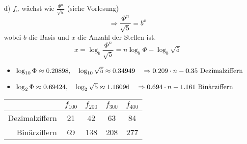 \begin{paragraph}{d)}
$f_n$ wächst wie $\frac{\Phi^n}{\sqrt{5}}$ (siehe Vorlesung)
\[ \Rightarrow \frac{\Phi^n}{\sqrt{5}} = b^x \] wobei $b$ die Basis und $x$ die Anzahl der Stellen ist.
\[ x = \log_b \frac{\Phi^n}{\sqrt{5}} = n \log_b \Phi - \log_b \sqrt{5} \]
\begin{itemize}
  \item $\log_{10} \Phi \approx 0.20898,\quad \log_{10} \sqrt{5} \approx 0.34949\quad \Rightarrow 0.209\cdot n - 0.35 \textnormal{ Dezimalziffern}$
  \item $\log_{2}  \Phi \approx 0.69424,\quad \log_{2} \sqrt{5} \approx 1.16096\quad \Rightarrow 0.694\cdot n - 1.161 \textnormal{ Binärziffern}$
\end{itemize}
\begin{table}[h!b!p!]
\begin{center}
\begin{tabular}{r|cccc}
& $f_{100}$ & $f_{200}$ & $f_{300}$ & $f_{400}$ \\
\hline
Dezimalziffern &  21 & 42 & 63 & 84 \\
Binärziffern   &  69 & 138& 208& 277
\end{tabular}
\end{center}
\end{table}
\end{paragraph}
